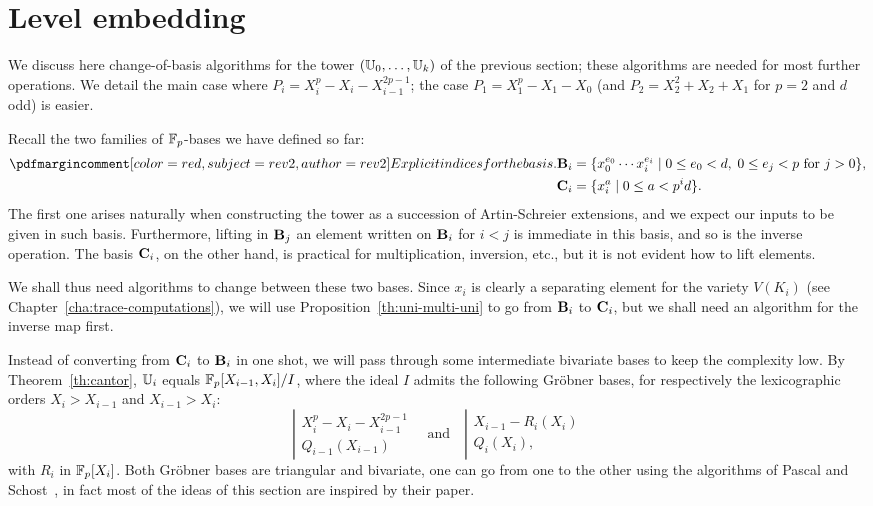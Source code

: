 \section{Level embedding}
\label{sec:level-embedding}

We discuss here change-of-basis algorithms for the tower $(\mathbb{U}_0,
\ldots, \mathbb{U}_k)$ of the previous section; these algorithms are needed
for most further operations. We detail the main case where $P_i =
X_i^p - X_i - X_{i-1}^{2p-1}$; the case $P_1= X_1^p - X_1 - X_0$ (and
$P_2=X_2^2+X_2+X_1$ for $p=2$ and $d$ odd) is easier.

Recall the two families of $\mathbb{F}_p$-bases we have defined so far:
\begin{align}
  \pdfmctwo{Explicit indices for the basis.}
  \basis{B}_i &=
  \{x_0^{e_0} \cdots x_i^{e_i} \;|\; 0 \le e_0 < d,\; 0\le e_j < p 
  \text{ for $j>0$}\}
  \text{,}\\
  \basis{C}_i&=\{x_i^a \;|\; 0\le a<p^id\}
  \text{.}  
\end{align}
The first one arises naturally when constructing the tower as a
succession of Artin-Schreier extensions, and we expect our inputs to
be given in such basis. Furthermore, lifting in $\mathbf{B}_j$ an
element written on $\mathbf{B}_i$ for $i<j$ is immediate in this basis,
and so is the inverse operation. The basis $\mathbf{C}_i$, on the
other hand, is practical for multiplication, inversion, etc., but it
is not evident how to lift elements.

We shall thus need algorithms to change between these two bases. Since
$x_i$ is clearly a separating element for the variety $V(K_i)$ (see
Chapter~\ref{cha:trace-computations}), we will use
Proposition~\ref{th:uni-multi-uni} to go from $\mathbf{B}_i$ to
$\mathbf{C}_i$, but we shall need an algorithm for the inverse map first.

Instead of converting from $\mathbf{C}_i$ to $\mathbf{B}_i$ in one shot,
we will pass through some intermediate bivariate bases to keep the
complexity low. By Theorem~\ref{th:cantor}, $\mathbb{U}_i$ equals
$\mathbb{F}_p[X_{i-1},X_i]/I$, where the ideal $I$ admits the following
Gr{\"o}bner bases, for respectively the lexicographic orders
$X_i>X_{i-1}$ and $X_{i-1}>X_i$:
\begin{equation}
  \left |
  \begin{array}{rl}
    X_i^p - X_i - X_{i-1}^{2p-1} \\
    Q_{i-1}(X_{i-1})         
  \end{array}
\right.
  \quad \text{and}\quad
  \left |
  \begin{array}{rl}
    X_{i-1} - R_i(X_i) \\
    Q_i(X_i),
  \end{array}
\right.
\end{equation}
with $R_i$ in $\mathbb{F}_p[X_i]$. Both Gröbner bases are triangular and
bivariate, one can go from one to the other using the algorithms of
Pascal and Schost~\cite{pascal+schost06}, in fact most of the ideas of
this section are inspired by their paper.

